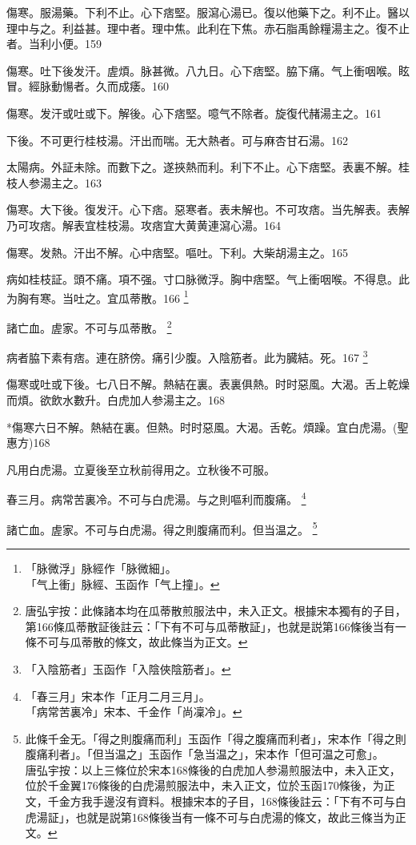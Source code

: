 \documentclass[b5paper,twoside,zihao=-4,UTF8]{ctexbook}
\begin{document}
傷寒。服湯藥。下利不止。心下痞堅。服瀉心湯已。復以他藥下之。利不止。醫以理中与之。利益甚。理中者。理中焦。此利在下焦。赤石脂禹餘糧湯主之。復不止者。当利小便。159

傷寒。吐下{後}发汗。虗煩。脉甚微。八九日。心下痞堅。脇下痛。气上衝咽喉。眩冒。經脉動愓者。久而成痿。160

傷寒。发汗{或}吐{或}下。解後。心下痞堅。噫气不除者。旋復代赭湯主之。161

下後。{不可更行桂枝湯。}汗出而喘。无大熱者。可与麻杏甘石湯。162

太陽病。外証未除。而數下之。遂挾熱而利。利下不止。心下痞堅。表裏不解。桂枝人参湯主之。163

傷寒。大下後。復发汗。心下痞。惡寒者。表未解也。不可攻痞。当先解表。表解乃可攻痞。解表宜桂枝湯。攻痞宜大黄黄連瀉心湯。164

傷寒。发熱。汗出不解。心中痞堅。嘔吐。下利。大柴胡湯主之。165

病如桂枝証。頭不痛。項不强。寸{口}脉微浮。胸中痞堅。气上衝咽喉。不得息。此为胸有寒。当吐之。宜瓜蒂散。166
	\footnote{「脉微浮」脉經作「脉微細」。\\「气上衝」脉經、玉函作「气上撞」。}

諸亡血。虗家。不可与瓜蒂散。
	\footnote{唐弘宇按：此條諸本均在瓜蒂散煎服法中，未入正文。根據宋本獨有的子目，第166條瓜蒂散証後註云：「下有不可与瓜蒂散証」，也就是説第166條後当有一條不可与瓜蒂散的條文，故此條当为正文。}

病者脇下素有痞。連在脐傍。痛引少腹。入陰筋者。此为臓結。死。167
	\footnote{「入陰筋者」玉函作「入陰俠陰筋者」。}

傷寒或吐或下後。七八日不解。熱結在裏。表裏俱熱。时时惡風。大渴。舌上乾燥而煩。欲飲水數升。白虎{加人参}湯主之。168

*傷寒六日不解。熱結在裏。但熱。时时惡風。大渴。舌乾。煩躁。宜白虎湯。(聖惠方)168

凡用白虎湯。立夏後至立秋前得用之。立秋後不可服。

春三月。病常苦裏冷。不可与白虎湯。与之則嘔利而腹痛。
	\footnote{「春三月」宋本作「正月二月三月」。\\「病常苦裏冷」宋本、千金作「尚凜冷」。}

諸亡血。虗家。不可与白虎湯。得之則腹痛而利。但当温之。
	\footnote{此條千金无。「得之則腹痛而利」玉函作「得之腹痛而利者」，宋本作「得之則腹痛利者」。「但当温之」玉函作「急当温之」，宋本作「但可温之可愈」。\\唐弘宇按：以上三條位於宋本168條後的白虎加人参湯煎服法中，未入正文，位於千金翼176條後的白虎湯煎服法中，未入正文，位於玉函170條後，为正文，千金方我手邊沒有資料。根據宋本的子目，168條後註云：「下有不可与白虎湯証」，也就是説第168條後当有一條不可与白虎湯的條文，故此三條当为正文。}
\end{document}
